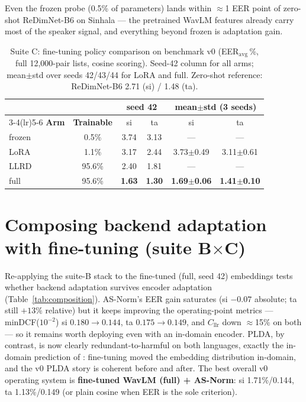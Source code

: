 Even the frozen probe (0.5\% of parameters) lands within
$\approx$1 EER point of zero-shot ReDimNet-B6 on Sinhala — the
pretrained WavLM features already carry most of the speaker signal,
and everything beyond frozen is adaptation gain.

\begin{table}[t]
\centering
\caption{Suite C: fine-tuning policy comparison on benchmark v0
(EER$_{\mathrm{avg}}$\,\%, full 12{,}000-pair lists, cosine scoring).
Seed-42 column for all arms; mean$\pm$std over seeds 42/43/44 for
LoRA and full. Zero-shot reference: ReDimNet-B6 2.71 (si) / 1.48 (ta).}
\label{tab:peft}
\begin{tabular}{lccccc}
\toprule
& & \multicolumn{2}{c}{\textbf{seed 42}} & \multicolumn{2}{c}{\textbf{mean$\pm$std (3 seeds)}} \\
\cmidrule(lr){3-4}\cmidrule(lr){5-6}
\textbf{Arm} & \textbf{Trainable} & si & ta & si & ta \\
\midrule
frozen & 0.5\%  & 3.74 & 3.13 & --- & --- \\
LoRA   & 1.1\%  & 3.17 & 2.44 & 3.73$\pm$0.49 & 3.11$\pm$0.61 \\
LLRD   & 95.6\% & 2.40 & 1.81 & --- & --- \\
full   & 95.6\% & \textbf{1.63} & \textbf{1.30} & \textbf{1.69$\pm$0.06} & \textbf{1.41$\pm$0.10} \\
\bottomrule
\end{tabular}
\end{table}

\section{Composing backend adaptation with fine-tuning
(suite B$\times$C)}
\label{sec:composition-results}

Re-applying the suite-B stack to the fine-tuned (full, seed 42)
embeddings tests whether backend adaptation survives encoder
adaptation (Table~\ref{tab:composition}). AS-Norm's EER gain
saturates (si $-0.07$ absolute; ta still $+13\%$ relative) but it
keeps improving the operating-point metrics — minDCF($10^{-2}$)
si $0.180\!\rightarrow\!0.144$, ta $0.175\!\rightarrow\!0.149$, and
$C_{\mathrm{llr}}$ down $\approx$15\% on both — so it remains worth
deploying even with an in-domain encoder. PLDA, by contrast, is now
clearly redundant-to-harmful on both languages, exactly the
in-domain prediction of \cite{wang2022plda}: fine-tuning moved the
embedding distribution in-domain, and the v0 PLDA story is coherent
before and after. The best overall v0 operating system is
\textbf{fine-tuned WavLM (full) + AS-Norm}: si 1.71\%/0.144, ta
1.13\%/0.149 (or plain cosine when EER is the sole criterion).

